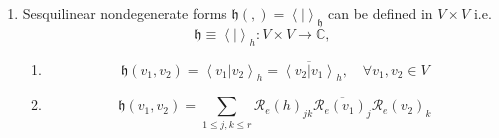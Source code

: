 \documentclass[aps,preprint]{revtex4}%
\begin{document}
\begin{enumerate}
\begin{enumerate}
\item
\begin{equation}
\left[  g\right]  \in\mathcal{B}_{00}\left(  V\right)  \cong V\otimes
V^{d}\hookrightarrow V^{d}\otimes V^{d}%
\end{equation}

\end{enumerate}

\item Sesquilinear nondegenerate forms $\mathfrak{h}\left(  ,\right)
=\left\langle \left.  {}\right\vert \left.  {}\right.  \right\rangle
_{\mathfrak{h}}$ can be defined in $V\times V$ i.e.
\begin{equation}
\mathfrak{h}\equiv\left\langle \left.  {}\right\vert \left.  {}\right.
\right\rangle _{h}:V\times V\rightarrow\mathbb{C},
\end{equation}


\begin{enumerate}
\item
\begin{equation}
\mathfrak{h}\left(  v_{1},v_{2}\right)  =\left\langle \left.  v_{1}\right\vert
v_{2}\right\rangle _{h}=\overline{\left\langle \left.  v_{2}\right\vert
v_{1}\right\rangle }_{h},\quad\forall v_{1},v_{2}\in V
\end{equation}


\item
\begin{equation}
\mathfrak{h}\left(  v_{1},v_{2}\right)  =%
{\displaystyle\sum\limits_{1\leq j,k\leq r}}
\mathcal{R}_{e}\left(  h\right)  _{jk}\overline{\mathcal{R}_{e}\left(
v_{1}\right)  _{j}}\mathcal{R}_{e}\left(  v_{2}\right)  _{k}%
\end{equation}



\end{enumerate}
\end{enumerate}
\end{document}
